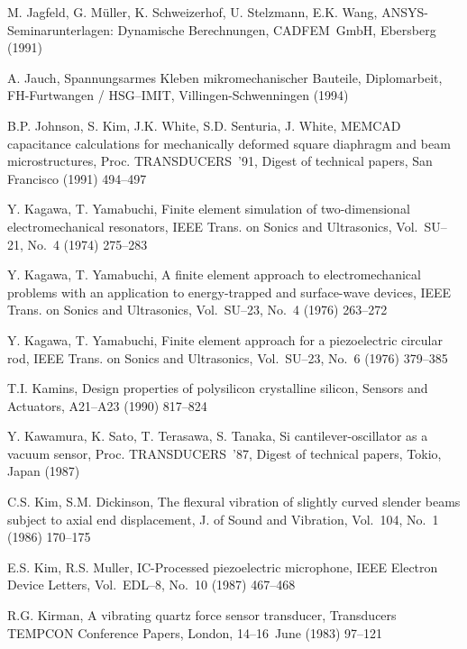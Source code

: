 \begin{thebibliography}{xxx}
 M. Jagfeld, G. Müller, K. Schweizerhof, U. Stelzmann, E.K. Wang,
 {\sf ANSYS}-Seminarunterlagen: Dynamische Berechnungen, CADFEM~GmbH,
 Ebersberg (1991)

 A. Jauch, Spannungsarmes Kleben mikromechanischer Bauteile, Diplomarbeit,
 FH-Furtwangen / HSG--IMIT, Villingen-Schwenningen (1994)

 B.P. Johnson, S. Kim, J.K. White, S.D. Senturia, J. White, {\sf MEMCAD}
 capacitance calculations for mechanically deformed square diaphragm and
 beam microstructures, Proc. TRANSDUCERS~'91, Digest of technical papers,
 San Francisco (1991) 494--497

 Y. Kagawa, T. Yamabuchi, Finite element simulation of two-dimensional
 electromechanical resonators, IEEE Trans. on Sonics and Ultrasonics,
 Vol.~SU--21, No.~4 (1974) 275--283

 Y. Kagawa, T. Yamabuchi, A finite element approach to electromechanical
 problems with an application to energy-trapped and surface-wave devices,
 IEEE Trans. on Sonics and Ultrasonics, Vol.~SU--23, No.~4 (1976) 263--272

 Y. Kagawa, T. Yamabuchi, Finite element approach for a piezoelectric
 circular rod, IEEE Trans. on Sonics and Ultrasonics, Vol.~SU--23, No.~6
  (1976) 379--385

 T.I. Kamins, Design properties of polysilicon crystalline silicon,
 Sensors and Actuators, A21--A23 (1990) 817--824

  Y. Kawamura, K. Sato, T. Terasawa, S. Tanaka, Si cantilever-oscillator as
  a vacuum sensor, Proc. TRANSDUCERS~'87, Digest of technical papers, Tokio,
  Japan (1987)

 C.S. Kim, S.M. Dickinson, The flexural vibration of slightly curved slender
 beams subject to axial end displacement, J. of Sound and Vibration,
 Vol.~104, No.~1 (1986) 170--175

 E.S. Kim, R.S. Muller, IC-Processed piezoelectric microphone, IEEE Electron
 Device Letters, Vol.~EDL--8, No.~10 (1987) 467--468

 R.G. Kirman, A vibrating quartz force sensor transducer, Transducers
 TEMPCON Conference Papers, London, 14--16~June (1983) 97--121


\end{thebibliography}
